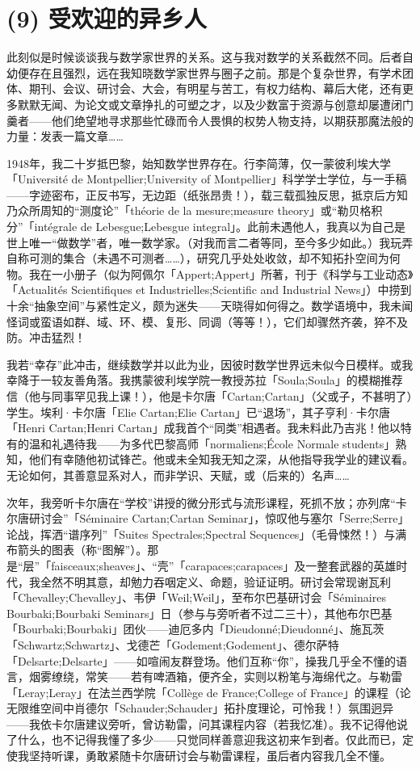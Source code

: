 \section{(9) 受欢迎的异乡人}

此刻似是时候谈谈我与数学家世界的关系。这与我对数学的关系截然不同。后者自幼便存在且强烈，远在我知晓数学家世界与圈子之前。那是个复杂世界，有学术团体、期刊、会议、研讨会、大会，有明星与苦工，有权力结构、幕后大佬，还有更多默默无闻、为论文或文章挣扎的可塑之才，以及少数富于资源与创意却屡遭闭门羹者——他们绝望地寻求那些忙碌而令人畏惧的权势人物支持，以期获那魔法般的力量：发表一篇文章……

1948年，我二十岁抵巴黎，始知数学世界存在。行李简薄，仅一蒙彼利埃大学「Université de Montpellier;University of Montpellier」科学学士学位，与一手稿——字迹密布，正反书写，无边距（纸张昂贵！），载三载孤独反思，抵京后方知乃众所周知的“测度论”「théorie de la mesure;measure theory」或“勒贝格积分”「intégrale de Lebesgue;Lebesgue integral」。此前未遇他人，我真以为自己是世上唯一“做数学”者，唯一数学家。（对我而言二者等同，至今多少如此。）我玩弄自称可测的集合（未遇不可测者……），研究几乎处处收敛，却不知拓扑空间为何物。我在一小册子（似为阿佩尔「Appert;Appert」所著，刊于《科学与工业动态》「Actualités Scientifiques et Industrielles;Scientific and Industrial News」）中捞到十余“抽象空间”与紧性定义，颇为迷失——天晓得如何得之。数学语境中，我未闻怪词或蛮语如群、域、环、模、复形、同调（等等！），它们却骤然齐袭，猝不及防。冲击猛烈！

我若“幸存”此冲击，继续数学并以此为业，因彼时数学世界远未似今日模样。或我幸降于一较友善角落。我携蒙彼利埃学院一教授苏拉「Soula;Soula」的模糊推荐信（他与同事罕见我上课！），他是卡尔唐「Cartan;Cartan」（父或子，不甚明了）学生。埃利·卡尔唐「Elie Cartan;Elie Cartan」已“退场”，其子亨利·卡尔唐「Henri Cartan;Henri Cartan」成我首个“同类”相遇者。我未料此乃吉兆！他以特有的温和礼遇待我——为多代巴黎高师「normaliens;École Normale students」熟知，他们有幸随他初试锋芒。他或未全知我无知之深，从他指导我学业的建议看。无论如何，其善意显系对人，而非学识、天赋，或（后来的）名声……

次年，我旁听卡尔唐在“学校”讲授的微分形式与流形课程，死抓不放；亦列席“卡尔唐研讨会”「Séminaire Cartan;Cartan Seminar」，惊叹他与塞尔「Serre;Serre」论战，挥洒“谱序列”「Suites Spectrales;Spectral Sequences」（毛骨悚然！）与满布箭头的图表（称“图解”）。那是“层”「faisceaux;sheaves」、“壳”「carapaces;carapaces」及一整套武器的英雄时代，我全然不明其意，却勉力吞咽定义、命题，验证证明。研讨会常现谢瓦利「Chevalley;Chevalley」、韦伊「Weil;Weil」，至布尔巴基研讨会「Séminaires Bourbaki;Bourbaki Seminars」日（参与与旁听者不过二三十），其他布尔巴基「Bourbaki;Bourbaki」团伙——迪厄多内「Dieudonné;Dieudonné」、施瓦茨「Schwartz;Schwartz」、戈德芒「Godement;Godement」、德尔萨特「Delsarte;Delsarte」——如喧闹友群登场。他们互称“你”，操我几乎全不懂的语言，烟雾缭绕，常笑——若有啤酒箱，便齐全，实则以粉笔与海绵代之。与勒雷「Leray;Leray」在法兰西学院「Collège de France;College of France」的课程（论无限维空间中肖德尔「Schauder;Schauder」拓扑度理论，可怜我！）氛围迥异——我依卡尔唐建议旁听，曾访勒雷，问其课程内容（若我忆准）。我不记得他说了什么，也不记得我懂了多少——只觉同样善意迎我这初来乍到者。仅此而已，定使我坚持听课，勇敢紧随卡尔唐研讨会与勒雷课程，虽后者内容我几全不懂。

